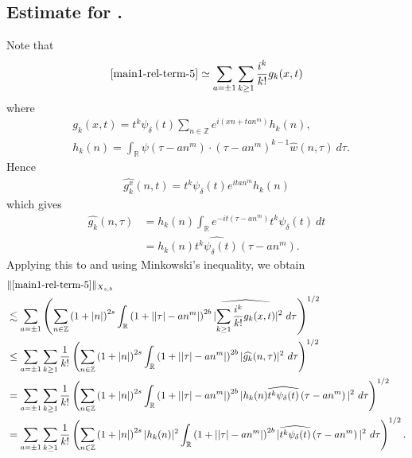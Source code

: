 \documentclass[12pt,reqno]{amsart}
\numberwithin{equation}{section}  %
\renewcommand{\cref}{\Cref}
\newcommand{\rr}{\mathbb{R}}
\newcommand{\zz}{\mathbb{Z}}
\newcommand{\wh}{\widehat}
\begin{document}
\subsection{Estimate for \cref{main1-rel-term-5}.}
Note that
%
%
\begin{equation}
	\label{1n}
	\begin{split}
    \cref{main1-rel-term-5} \simeq \sum_{a = \pm 1}\sum_{k \ge 1}
		\frac{i^k}{k!}g_k(x,t)
	\end{split}
\end{equation}
%
%
where 
%
%
\begin{equation*}
	\begin{split}
		& g_k(x,t) = t^k \psi_{\delta}(t) \sum_{n \in \zz} e^{i\left( xn + ta n^{m}
		\right)} h_k(n),
		\\
		& h_k(n) = \int_\rr \psi \left( \tau - an^{m } \right) \cdot \left(
		\tau - an^{m } \right)^{k -1} \wh{w}(n, \tau) \ d \tau.
	\end{split}
\end{equation*}
%
%
Hence
%
%
\begin{equation*}
	\begin{split}
		\wh{g_k^x}(n, t) = t^{k} \psi_{\delta}(t) e^{i t an^{m }} h_k(n)
	\end{split}
\end{equation*}
%
%
which gives
%
%
\begin{equation*}
	\begin{split}
		\wh{g_k}(n, \tau)
		& = h_k(n) \int_\rr e^{-it\left( \tau - an^{m } \right)}
		t^{k}\psi_{\delta}(t) \ dt
		\\
		& = h_k(n) \wh{t^{k}\psi_{\delta}(t)} \left( \tau - an^{m } \right).
	\end{split}
\end{equation*}
%
%
Applying this to \cref{1n} and using Minkowski's inequality, we obtain
%
%
\begin{equation}
	\label{2n}
	\begin{split}
		& \|\cref{main1-rel-term-5}\|_{X_{s,b}} 
    \\
    & \lesssim \sum_{a = \pm 1} \left( \sum_{n \in \zz} \left (1 + |n| \right )^{2s}
    \int_\rr \left( 1 + | |\tau| - an^{m } | \right)^{2b}
    | \wh{\sum_{k \ge 1} \frac{i^k}{k!}g_k(x,t)} |^2 \ d \tau
		\right)^{1/2}
		\\
		& \le \sum_{a = \pm 1}\sum_{k \ge 1} \frac{1}{k!}\left( \sum_{n \in \zz} \left (1 + |n| \right )^{2s}
    \int_\rr \left( 1 + | |\tau| - an^{m } | \right)^{2b} | \wh{g_k}(n, \tau) |^2 \
		d \tau \right)^{1/2}
		\\
		& = \sum_{a = \pm 1}\sum_{k \ge 1} \frac{1}{k!} \left( \sum_{n \in \zz} \left (1 + |n| \right )^{2s}
    \int_\rr \left( 1 + | |\tau| - an^{m } | \right)^{2b} | h_k(n) \wh{t^k
		\psi_{\delta}(t)} \left( \tau - an^{m } \right) |^2 \ d \tau \right)^{1/2}
		\\
		& = \sum_{a = \pm 1}\sum_{k \ge 1} \frac{1}{k!} \left( \sum_{n \in \zz} \left (1 + |n| \right )^{2s} |
    h_k(n) |^2 \int_\rr \left( 1 + | |\tau| - an^{m } | \right)^{2b} | \wh{t^k
		\psi_{\delta}(t)} \left( \tau - an^{m } \right) |^2 \ d \tau \right)^{1/2}.
	\end{split}
\end{equation}
\end{document}
